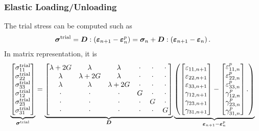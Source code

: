 \subsubsection{Elastic Loading/Unloading}
The trial stress can be computed such as
\begin{gather}\label{eq:j2_tsigma}
\bm{\sigma}^\text{trial}=\bm{D}:\left(\bm{\varepsilon}_{n+1}-\bm{\varepsilon}^p_n\right)=\bm{\sigma}_n+\bm{D}:\left(\bm{\varepsilon}_{n+1}-\bm{\varepsilon}_n\right).
\end{gather}
In matrix representation, it is
\begin{gather}
\underbrace{
\begin{bmatrix}
\sigma^\text{trial}_{11}\\
\sigma^\text{trial}_{22}\\
\sigma^\text{trial}_{33}\\
\sigma^\text{trial}_{12}\\
\sigma^\text{trial}_{23}\\
\sigma^\text{trial}_{31}
\end{bmatrix}}_{\bm{\sigma}^\text{trial}}
=
\underbrace{\begin{bmatrix}
\lambda+2G&\lambda&\lambda&\cdot&\cdot&\cdot\\
\lambda&\lambda+2G&\lambda&\cdot&\cdot&\cdot\\
\lambda&\lambda&\lambda+2G&\cdot&\cdot&\cdot\\
\cdot&\cdot&\cdot&G&\cdot&\cdot\\
\cdot&\cdot&\cdot&\cdot&G&\cdot\\
\cdot&\cdot&\cdot&\cdot&\cdot&G
\end{bmatrix}}_{\bm{D}}
\underbrace{\left(\begin{bmatrix}
\varepsilon_{11,n+1}\\
\varepsilon_{22,n+1}\\
\varepsilon_{33,n+1}\\
     \gamma_{12,n+1}\\
     \gamma_{23,n+1}\\
     \gamma_{31,n+1}
\end{bmatrix}-\begin{bmatrix}
\varepsilon^p_{11,n}\\
\varepsilon^p_{22,n}\\
\varepsilon^p_{33,n}\\
     \gamma^p_{12,n}\\
     \gamma^p_{23,n}\\
     \gamma^p_{31,n}
\end{bmatrix}.
\right)}_{\bm{\varepsilon}_{n+1}-\bm{\varepsilon}^p_n}
\end{gather}

